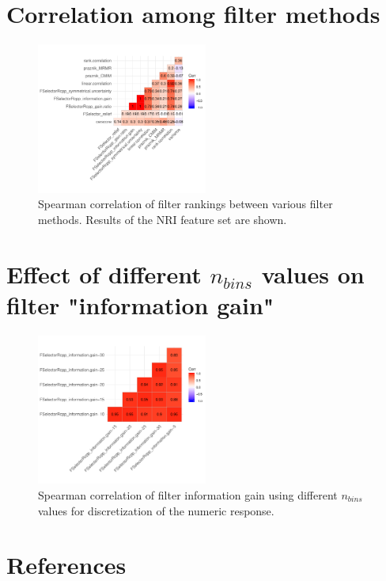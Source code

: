 \documentclass[letterpaper, journal]{IEEEtran}
\begin{document}
\pagebreak

\section{Correlation among filter methods}

\begin{figure} [h]
\begin{center}
\includegraphics[width=0.5\textwidth] {correlation-filter-nri-1.pdf}
\caption{Spearman correlation of filter rankings between various filter methods. Results of the NRI feature set are shown.}
\label{fig:correlation-filters}
\end{center}
\end{figure}

\section{Effect of different \texttt{$n_{bins}$} values on filter "information gain"}

\begin{figure} [h]
\begin{center}
\includegraphics[width=0.5\textwidth] {correlation-nbins-1.pdf}
\caption{Spearman correlation of filter information gain using different \texttt{$n_{bins}$} values for discretization of the numeric response.}
\label{fig:correlation-nbins}
\end{center}
\end{figure}




\section*{References}
\end{document}
